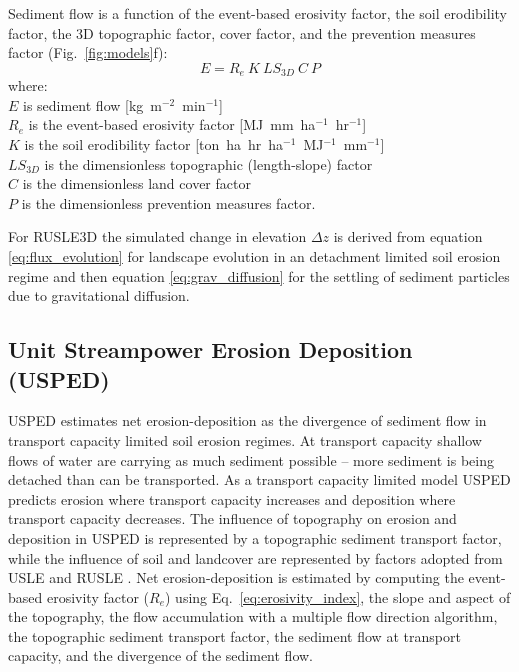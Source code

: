 \documentclass[gmd, manuscript]{copernicus}
\begin{document}
Sediment flow is a function of the event-based erosivity factor, 
the soil erodibility factor, the 3D topographic factor, cover factor, and the prevention measures factor 
(Fig.~\ref{fig:models}f):
%
\begin{equation}
\label{eq:rusle}
{E = R_e ~ K ~ LS_{3D} ~ C ~ P}
\end{equation}
%
{\small
\noindent
where: \\
\noindent
\hspace*{0.5em} $E$ is sediment flow [\unit{kg~m}$^{-2}$~\unit{min}$^{-1}$]\\
\hspace*{0.5em} $R_e$ is the event-based erosivity factor [\unit{MJ~mm~ha}$^{-1}$~\unit{hr}$^{-1}$]\\
\hspace*{0.5em} $K$ is the soil erodibility factor [\unit{ton~ha~hr~ha}$^{-1}$~\unit{MJ}$^{-1}$~\unit{mm}$^{-1}$]\\
\hspace*{0.5em} $LS_{3D}$ is the dimensionless topographic (length-slope) factor\\
\hspace*{0.5em} $C$ is the dimensionless land cover factor\\
\hspace*{0.5em} $P$ is the dimensionless prevention measures factor.\\
}

\noindent
For RUSLE3D the simulated change in elevation 
$\Delta z$
is derived from 
equation \ref{eq:flux_evolution}
for landscape evolution in an detachment limited soil erosion regime
and then equation \ref{eq:grav_diffusion}
for the settling of sediment particles due to gravitational diffusion.


\subsection{Unit Streampower Erosion Deposition (USPED)} \label{usped_model}
USPED estimates net erosion-deposition as the divergence of sediment flow
in transport capacity limited soil erosion regimes.
At transport capacity 
shallow flows of water are carrying as much sediment possible 
-- more sediment is being detached 
than can be transported.
As a transport capacity limited model
USPED predicts erosion where transport capacity increases
and deposition where transport capacity decreases. 
The influence of topography on erosion and deposition in USPED 
is represented by a topographic sediment transport factor,
while the influence of soil and landcover are represented by 
factors adopted from USLE and RUSLE
\citep{Mitasova1996}.
%
Net erosion-deposition is estimated by computing
the event-based erosivity factor ($R_e$) 
using Eq.~\ref{eq:erosivity_index},
the slope and aspect of the topography,
the flow accumulation with a multiple flow direction algorithm,
the topographic sediment transport factor,
the sediment flow at transport capacity,
and the divergence of the sediment flow. 
\end{document}
